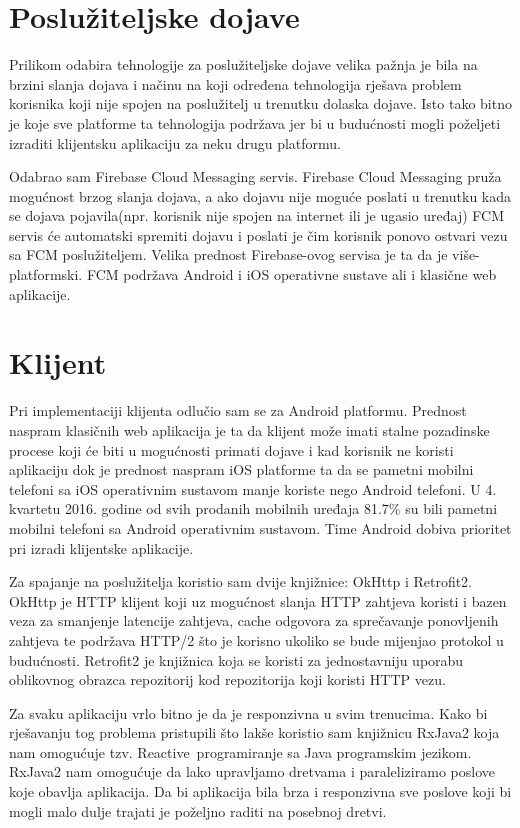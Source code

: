 \documentclass[times, utf8, zavrsni]{fer}
\begin{document}
\section{Poslužiteljske dojave}

Prilikom odabira tehnologije za poslužiteljske dojave velika pažnja je bila na brzini slanja dojava i načinu na koji određena tehnologija rješava problem korisnika koji nije spojen na poslužitelj u trenutku dolaska dojave. Isto tako bitno je koje sve platforme ta tehnologija podržava jer bi u budućnosti mogli poželjeti izraditi klijentsku aplikaciju za neku drugu platformu.

Odabrao sam Firebase Cloud Messaging servis. Firebase Cloud Messaging pruža mogućnost brzog slanja dojava, a ako dojavu nije moguće poslati u trenutku kada se dojava pojavila(npr. korisnik nije spojen na internet ili je ugasio uređaj) FCM servis će automatski spremiti dojavu i poslati je čim korisnik ponovo ostvari vezu sa FCM poslužiteljem. Velika prednost Firebase-ovog servisa je ta da je više-platformski. FCM podržava Android i iOS operativne sustave ali i klasične web aplikacije.

\section{Klijent}

Pri implementaciji klijenta odlučio sam se za Android platformu. Prednost naspram klasičnih web aplikacija je ta da klijent može imati stalne pozadinske procese koji će biti u mogućnosti primati dojave i kad korisnik ne koristi aplikaciju dok je prednost naspram iOS platforme ta da se pametni mobilni telefoni sa iOS operativnim sustavom manje koriste nego Android telefoni. U 4. kvartetu 2016. godine od svih prodanih mobilnih uređaja 81.7\% \citep{vincent2017} su bili pametni mobilni telefoni sa Android operativnim sustavom. Time Android dobiva prioritet pri izradi klijentske aplikacije.

Za spajanje na poslužitelja koristio sam dvije knjižnice: OkHttp i Retrofit2. OkHttp je HTTP klijent koji uz mogućnost slanja HTTP zahtjeva koristi i bazen veza za smanjenje latencije zahtjeva, cache odgovora za sprečavanje ponovljenih zahtjeva te podržava HTTP/2 što je korisno ukoliko se bude mijenjao protokol u budućnosti. Retrofit2 je knjižnica koja se koristi za jednostavniju uporabu oblikovnog obrazca repozitorij kod repozitorija koji koristi HTTP vezu.

Za svaku aplikaciju vrlo bitno je da je responzivna u svim trenucima. Kako bi rješavanju tog problema pristupili što lakše koristio sam knjižnicu RxJava2 koja nam omogućuje tzv. \glqq Reactive\grqq\  programiranje sa Java programskim jezikom. RxJava2 nam omogućuje da lako upravljamo dretvama i paraleliziramo poslove koje obavlja aplikacija. Da bi aplikacija bila brza i responzivna sve poslove koji bi mogli malo dulje trajati je poželjno raditi na posebnoj dretvi.
\end{document}
